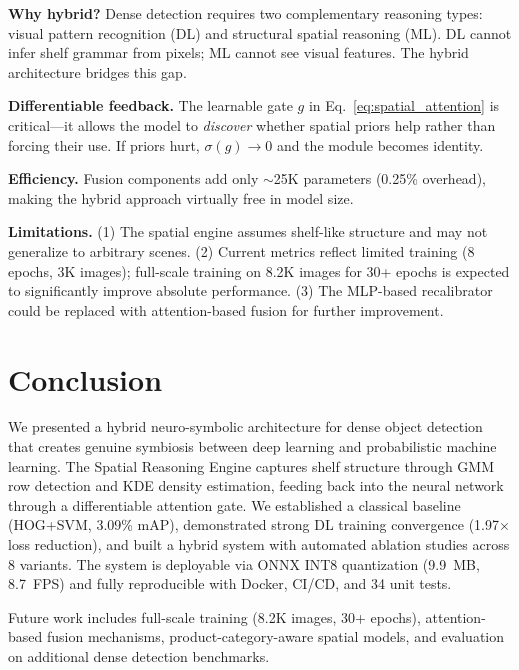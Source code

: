 \documentclass[conference]{IEEEtran}
\begin{document}
\textbf{Why hybrid?} Dense detection requires two complementary reasoning types: visual pattern recognition (DL) and structural spatial reasoning (ML). DL cannot infer shelf grammar from pixels; ML cannot see visual features. The hybrid architecture bridges this gap.

\textbf{Differentiable feedback.} The learnable gate $g$ in Eq.~\ref{eq:spatial_attention} is critical---it allows the model to \emph{discover} whether spatial priors help rather than forcing their use. If priors hurt, $\sigma(g) \rightarrow 0$ and the module becomes identity.

\textbf{Efficiency.} Fusion components add only $\sim$25K parameters (0.25\% overhead), making the hybrid approach virtually free in model size.

\textbf{Limitations.} (1) The spatial engine assumes shelf-like structure and may not generalize to arbitrary scenes. (2) Current metrics reflect limited training (8 epochs, 3K images); full-scale training on 8.2K images for 30+ epochs is expected to significantly improve absolute performance. (3) The MLP-based recalibrator could be replaced with attention-based fusion for further improvement.

\section{Conclusion}
\label{sec:conclusion}

We presented a hybrid neuro-symbolic architecture for dense object detection that creates genuine symbiosis between deep learning and probabilistic machine learning. The Spatial Reasoning Engine captures shelf structure through GMM row detection and KDE density estimation, feeding back into the neural network through a differentiable attention gate. We established a classical baseline (HOG+SVM, 3.09\% mAP), demonstrated strong DL training convergence (1.97$\times$ loss reduction), and built a hybrid system with automated ablation studies across 8 variants. The system is deployable via ONNX INT8 quantization (9.9~MB, 8.7~FPS) and fully reproducible with Docker, CI/CD, and 34 unit tests.

Future work includes full-scale training (8.2K images, 30+ epochs), attention-based fusion mechanisms, product-category-aware spatial models, and evaluation on additional dense detection benchmarks.
\end{document}
